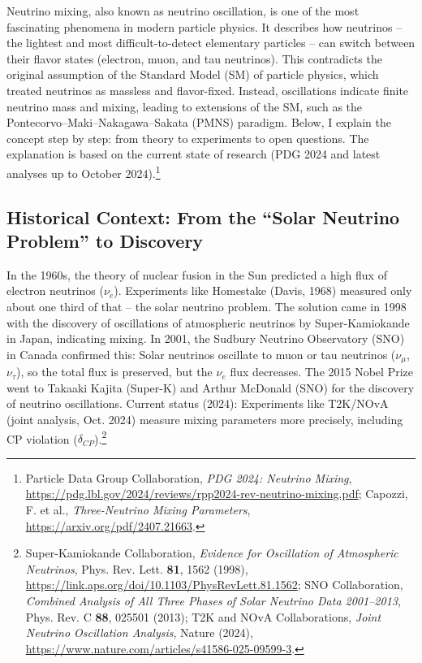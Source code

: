	Neutrino mixing, also known as neutrino oscillation, is one of the most fascinating phenomena in modern particle physics. It describes how neutrinos -- the lightest and most difficult-to-detect elementary particles -- can switch between their flavor states (electron, muon, and tau neutrinos). This contradicts the original assumption of the Standard Model (SM) of particle physics, which treated neutrinos as massless and flavor-fixed. Instead, oscillations indicate finite neutrino mass and mixing, leading to extensions of the SM, such as the Pontecorvo--Maki--Nakagawa--Sakata (PMNS) paradigm. Below, I explain the concept step by step: from theory to experiments to open questions. The explanation is based on the current state of research (PDG 2024 and latest analyses up to October 2024).\footnote{Particle Data Group Collaboration, \emph{PDG 2024: Neutrino Mixing}, \url{https://pdg.lbl.gov/2024/reviews/rpp2024-rev-neutrino-mixing.pdf}; Capozzi, F. et al., \emph{Three-Neutrino Mixing Parameters}, \url{https://arxiv.org/pdf/2407.21663}.}
	
	\subsection{Historical Context: From the ``Solar Neutrino Problem'' to Discovery}
	
	In the 1960s, the theory of nuclear fusion in the Sun predicted a high flux of electron neutrinos ($\nu_e$). Experiments like Homestake (Davis, 1968) measured only about one third of that -- the solar neutrino problem. The solution came in 1998 with the discovery of oscillations of atmospheric neutrinos by Super-Kamiokande in Japan, indicating mixing. In 2001, the Sudbury Neutrino Observatory (SNO) in Canada confirmed this: Solar neutrinos oscillate to muon or tau neutrinos ($\nu_\mu$, $\nu_\tau$), so the total flux is preserved, but the $\nu_e$ flux decreases. The 2015 Nobel Prize went to Takaaki Kajita (Super-K) and Arthur McDonald (SNO) for the discovery of neutrino oscillations. Current status (2024): Experiments like T2K/NOvA (joint analysis, Oct. 2024) measure mixing parameters more precisely, including CP violation ($\delta_{CP}$).\footnote{Super-Kamiokande Collaboration, \emph{Evidence for Oscillation of Atmospheric Neutrinos}, Phys. Rev. Lett. \textbf{81}, 1562 (1998), \url{https://link.aps.org/doi/10.1103/PhysRevLett.81.1562}; SNO Collaboration, \emph{Combined Analysis of All Three Phases of Solar Neutrino Data 2001--2013}, Phys. Rev. C \textbf{88}, 025501 (2013); T2K and NOvA Collaborations, \emph{Joint Neutrino Oscillation Analysis}, Nature (2024), \url{https://www.nature.com/articles/s41586-025-09599-3}.}
	
